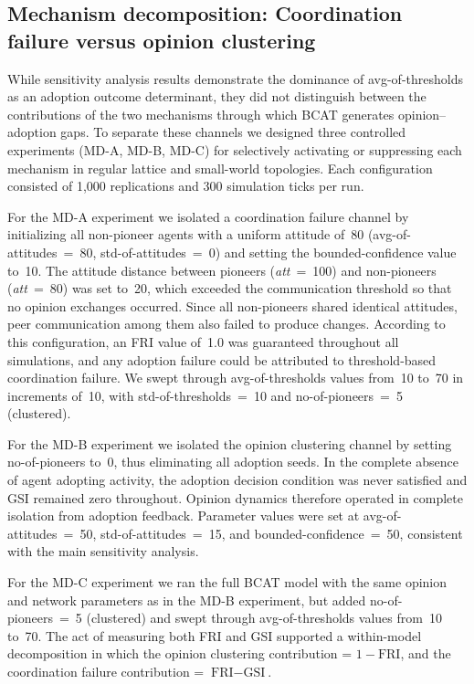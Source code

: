 \documentclass[10pt,letterpaper]{article}
\begin{document}
\subsection*{Mechanism decomposition: Coordination failure versus opinion clustering}

While sensitivity analysis results demonstrate the dominance of avg-of-thresholds as an adoption outcome determinant, they did not distinguish between the contributions of the two mechanisms through which BCAT generates opinion--adoption gaps. To separate these channels we designed three controlled experiments (MD-A, MD-B, MD-C) for selectively activating or suppressing each mechanism in regular lattice and small-world topologies. Each configuration consisted of 1,000 replications and 300 simulation ticks per run.

For the MD-A experiment we isolated a coordination failure channel by initializing all non-pioneer agents with a uniform attitude of~80 (avg-of-attitudes~=~80, std-of-attitudes~=~0) and setting the bounded-confidence value to~10. The attitude distance between pioneers (\textit{att}~=~100) and non-pioneers (\textit{att}~=~80) was set to~20, which exceeded the communication threshold so that no opinion exchanges occurred. Since all non-pioneers shared identical attitudes, peer communication among them also failed to produce changes. According to this configuration, an FRI value of~1.0 was guaranteed throughout all simulations, and any adoption failure could be attributed to threshold-based coordination failure. We swept through avg-of-thresholds values from~10 to~70 in increments of~10, with std-of-thresholds~=~10 and no-of-pioneers~=~5 (clustered).

For the MD-B experiment we isolated the opinion clustering channel by setting no-of-pioneers to~0, thus eliminating all adoption seeds. In the complete absence of agent adopting activity, the adoption decision condition was never satisfied and GSI remained zero throughout. Opinion dynamics therefore operated in complete isolation from adoption feedback. Parameter values were set at avg-of-attitudes~=~50, std-of-attitudes~=~15, and bounded-confidence~=~50, consistent with the main sensitivity analysis.

For the MD-C experiment we ran the full BCAT model with the same opinion and network parameters as in the MD-B experiment, but added no-of-pioneers~=~5 (clustered) and swept through avg-of-thresholds values from~10 to~70. The act of measuring both FRI and GSI supported a within-model decomposition in which the opinion clustering contribution = $1 - \text{FRI}$, and the coordination failure contribution = $\text{FRI} - \text{GSI}$.
\end{document}
